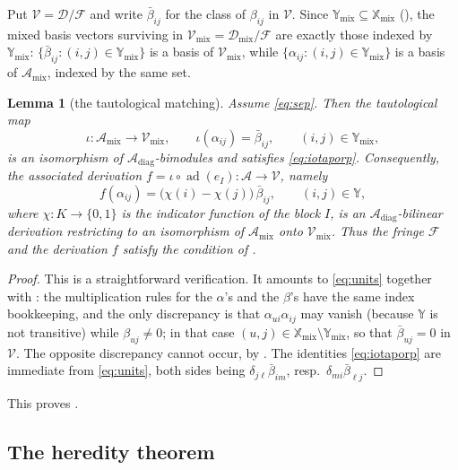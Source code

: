 \documentclass[12pt]{article}
\newtheorem{lemma}[lemma]{Lemma}
\theoremstyle{definition}
\newcommand{\mix}{\mathrm{mix}}   %
\newcommand{\diag}{\mathrm{diag}} %
\newcommand{\ad}{\operatorname{ad}}
\newcommand{\alg}{\mathcal{A}}   %
\newcommand{\bmdl}{\mathcal{D}}   %
\newcommand{\XX}{\mathbb{X}}  %
\newcommand{\YY}{\mathbb{Y}}  %
\newcommand{\Kk}{K}         %
\newcommand{\algbss}{\alpha}     %
\newcommand{\bmdlbss}{\beta}    %
\newcommand{\Ff}{\mathcal{F}}   %
\newcommand{\Vv}{\mathcal{V}}   %
\begin{document}
Put $\Vv = \bmdl/\Ff$ and write $\bar\bmdlbss_{ij}$ for the class of
$\bmdlbss_{ij}$ in $\Vv$. Since $\YY_{\mix} \subseteq
\XX_{\mix}$ (), the mixed basis vectors surviving
in $\Vv_{\mix} = \bmdl_{\mix}/\Ff$ are exactly those
indexed by $\YY_{\mix}$: $\{\bar\bmdlbss_{ij} : (i,j) \in
\YY_{\mix}\}$ is a basis of $\Vv_{\mix}$, while
$\{\algbss_{ij} : (i,j) \in \YY_{\mix}\}$ is a basis of
$\alg_{\mix}$, indexed by the same set.

\begin{lemma}[the tautological matching]\label{lem:taut}
Assume \eqref{eq:sep}. Then the tautological map
\begin{equation}\label{eq:taut}
   \iota : \alg_{\mix} \longrightarrow \Vv_{\mix}, \qquad
   \iota(\algbss_{ij}) = \bar\bmdlbss_{ij},
   \qquad (i,j) \in \YY_{\mix} ,
\end{equation}
is an isomorphism of $\alg_{\diag}$-bimodules and satisfies
\eqref{eq:iotaporp}. Consequently, the associated derivation
$f = \iota\circ\ad(e_I) : \alg \to \Vv$, namely
\[
   f(\algbss_{ij}) = \bigl(\chi(i)-\chi(j)\bigr)\,\bar\bmdlbss_{ij},
   \qquad (i,j) \in \YY ,
\]
where $\chi : \Kk \to \{0,1\}$ is the indicator function of the block $I$,
is an $\alg_{\diag}$-bilinear derivation restricting to an isomorphism of
$\alg_{\mix}$ onto $\Vv_{\mix}$. Thus the fringe $\Ff$ and the derivation
$f$ satisfy the condition of .
\end{lemma}

\begin{proof}
This is a straightforward verification.
It amounts to \eqref{eq:units} together with : the
multiplication rules for the $\algbss$'s and the $\bmdlbss$'s have the same index
bookkeeping, and the only discrepancy is that $\algbss_{ui}\algbss_{ij}$ may vanish
(because $\YY$ is not transitive) while $\bmdlbss_{uj}\ne0$; in that case
$(u,j)\in\XX_{\mix}\setminus\YY_{\mix}$, so that $\bar\bmdlbss_{uj}=0$ in $\Vv$.
The opposite discrepancy cannot occur, by .
The identities \eqref{eq:iotaporp} are immediate from \eqref{eq:units}, both sides
being $\delta_{j\ell}\bar\bmdlbss_{im}$, resp.\ $\delta_{mi}\bar\bmdlbss_{\ell j}$.
\end{proof}

This proves .

\subsection{The heredity theorem}
\end{document}
